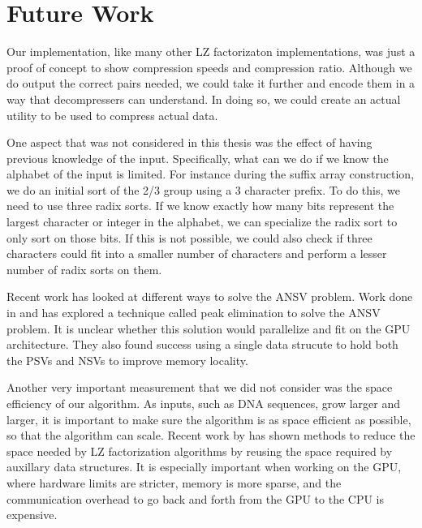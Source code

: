 \chapter{Future Work}

Our implementation, like many other LZ factorizaton implementations, was just a proof of concept to show compression speeds and compression ratio.
Although we do output the correct pairs needed, we could take it further and encode them in a way that decompressers can understand.
In doing so, we could create an actual utility to be used to compress actual data.

One aspect that was not considered in this thesis was the effect of having previous knowledge of the input.
Specifically, what can we do if we know the alphabet of the input is limited.
For instance during the suffix array construction, we do an initial sort of the 2/3 group using a 3 character prefix.
To do this, we need to use three radix sorts.
If we know exactly how many bits represent the largest character or integer in the alphabet, we can specialize the radix sort to only sort on those bits.
If this is not possible, we could also check if three characters could fit into a smaller number of characters and perform a lesser number of radix sorts on them.

Recent work has looked at different ways to solve the ANSV problem.
Work done in \cite{Computing longest previous factor in linear time and applications} and \cite{Simpler and Faster Lempel Ziv Factorization} has explored a technique called peak elimination to solve the ANSV problem.
It is unclear whether this solution would parallelize and fit on the GPU architecture.
They also found success using a single data strucute to hold both the PSVs and NSVs to improve memory locality.

Another very important measurement that we did not consider was the space efficiency of our algorithm.
As inputs, such as DNA sequences, grow larger and larger, it is important to make sure the algorithm is as space efficient as possible, so that the algorithm can scale.
Recent work by \cite{Space Efﬁcient Linear Time Lempel-Ziv Factorization on Constant Size Alphabets} has shown methods to reduce the space needed by LZ factorization algorithms by reusing the space required by auxillary data structures.
It is especially important when working on the GPU, where hardware limits are stricter, memory is more sparse, and the communication overhead to go back and forth from the GPU to the CPU is expensive.

